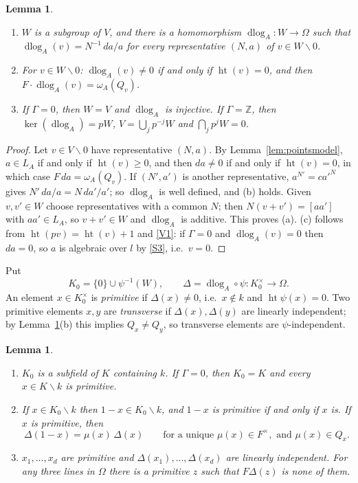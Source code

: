 \documentclass[11pt]{amsart}
\newtheorem{lemma}[theorem]{Lemma}
\theoremstyle{definition}
\theoremstyle{remark}
\newcommand{\ZZ}{\mathbb{Z}}
\newcommand{\hgt}{\operatorname{ht}}
\newcommand{\dlog}{\operatorname{dlog}}
\newcommand{\sm}{\smallsetminus}
\begin{document}
\begin{lemma}\label{lem:W}
\begin{enumerate}[label=\textup{(\alph*)}]
\item $W$ is a subgroup of $V$, and there is a homomorphism $\dlog_A\colon W\to\Omega$ such that $\dlog_A(v)=N^{-1}\,da/a$ for every representative $(N,a)$ of $v\in W\sm0$.
\item For $v\in W\sm0$: $\dlog_A(v)\neq0$ if and only if $\hgt(v)=0$, and then $F\cdot\dlog_A(v)=\omega_A(Q_v)$.
\item If $\Gamma=0$, then $W=V$ and $\dlog_A$ is injective. If $\Gamma=\ZZ$, then $\ker(\dlog_A)=pW$, $V=\bigcup_jp^{-j}W$ and $\bigcap_jp^jW=0$.
\end{enumerate}
\end{lemma}

\begin{proof}
Let $v\in V\sm0$ have representative $(N,a)$. By Lemma~\ref{lem:pointsmodel}, $a\in L_A$ if and only if $\hgt(v)\ge0$, and then $da\ne0$ if and only if $\hgt(v)=0$, in which case $F\,da=\omega_A(Q_v)$.
If $(N',a')$ is another representative, $a^{N'}=ca'^N$ gives $N'\,da/a=N\,da'/a'$; so $\dlog_A$ is well defined, and (b) holds.
Given $v,v'\in W$ choose representatives with a common $N$; then $N(v+v')=[aa']$ with $aa'\in L_A$, so $v+v'\in W$ and $\dlog_A$ is additive. This proves (a).
(c) follows from $\hgt(pv)=\hgt(v)+1$ and \ref{V1}: if $\Gamma=0$ and $\dlog_A(v)=0$ then $da=0$, so $a$ is algebraic over $l$ by \ref{S3}, i.e.\ $v=0$.
\end{proof}

Put
\[ K_0=\{0\}\cup\psi^{-1}(W),\qquad \Delta=\dlog_A\circ\psi\colon K_0^\times\to\Omega . \]
An element $x\in K_0^\times$ is \emph{primitive} if $\Delta(x)\ne0$, i.e.\ $x\notin k$ and $\hgt\psi(x)=0$. Two primitive elements $x,y$ are \emph{transverse} if $\Delta(x),\Delta(y)$ are linearly independent; by Lemma~\ref{lem:W}(b) this implies $Q_x\neq Q_y$, so transverse elements are $\psi$-independent.

\begin{lemma}\label{lem:K0}
\begin{enumerate}[label=\textup{(\alph*)}]
\item $K_0$ is a subfield of $K$ containing $k$. If $\Gamma=0$, then $K_0=K$ and every $x\in K\sm k$ is primitive.
\item If $x\in K_0\sm k$ then $1-x\in K_0\sm k$, and $1-x$ is primitive if and only if $x$ is. If $x$ is primitive, then
\[ \Delta(1-x)=\mu(x)\,\Delta(x)\qquad\text{for a unique }\mu(x)\in F^\times,\text{ and }\mu(x)\in Q_x . \]
\item $x_1,\dots,x_d$ are primitive and $\Delta(x_1),\dots,\Delta(x_d)$ are linearly independent. For any three lines in $\Omega$ there is a primitive $z$ such that $F\Delta(z)$ is none of them.
\end{enumerate}
\end{lemma}
\end{document}
